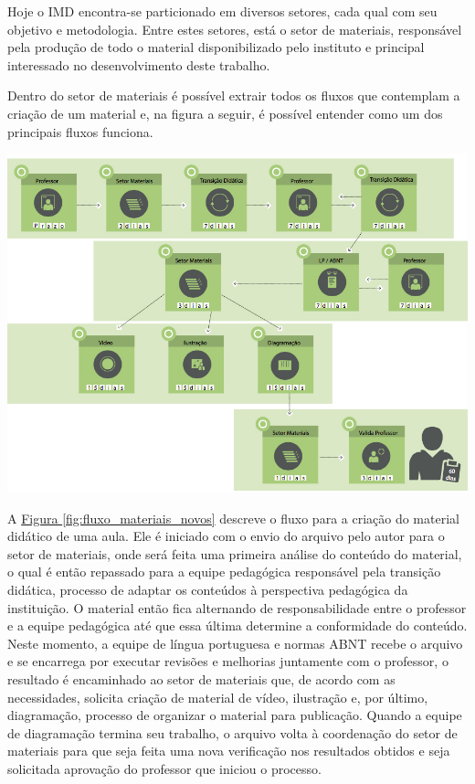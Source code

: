 Hoje o IMD encontra-se particionado em diversos setores, cada qual com seu objetivo e metodologia. Entre estes setores, está o setor de materiais, responsável pela produção de todo o material disponibilizado pelo instituto e principal interessado no desenvolvimento deste trabalho. 

Dentro do setor de materiais é possível extrair todos os fluxos que contemplam a criação de um material e, na figura a seguir, é possível entender como um dos principais fluxos funciona. \\

\vspace{5mm}
\begin{minipage}[c]{\textwidth}
    \includegraphics[width=14cm]{Imagens/FluxoMateriaisNovos.jpg}
    \label{fig:fluxo_materiais_novos}
\end{minipage}
\vspace{5mm}

A \hyperref[fig:fluxo_materiais_novos]{Figura \ref{fig:fluxo_materiais_novos}} descreve o fluxo para a criação do material didático de uma aula. Ele é iniciado com o envio do arquivo pelo autor para o setor de materiais, onde será feita uma primeira análise do conteúdo do material, o qual é então repassado para a equipe pedagógica responsável pela transição didática, processo de adaptar os conteúdos à perspectiva pedagógica da instituição. O material então fica alternando de responsabilidade entre o professor e a equipe pedagógica até que essa última determine a conformidade do conteúdo. Neste momento, a equipe de língua portuguesa e normas ABNT recebe o arquivo e se encarrega por executar revisões e melhorias juntamente com o professor, o resultado é encaminhado ao setor de materiais que, de acordo com as necessidades, solicita criação de material de vídeo, ilustração e, por último, diagramação, processo de organizar o material para publicação. Quando a equipe de diagramação termina seu trabalho, o arquivo volta à coordenação do setor de materiais para que seja feita uma nova verificação nos resultados obtidos e seja solicitada aprovação do professor que iniciou o processo.

